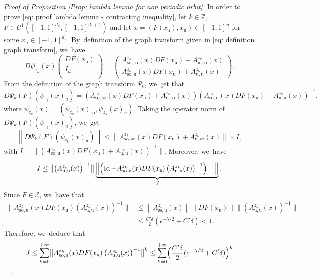 \documentclass[JEP,XML,SOM,Unicode,NoEqCountersInSection,NoFloatCountersInSection,published]{cedram}
\newcommand{\rs}{\mathrm{s}}
\newcommand{\rso}{\mathrm{so}}
\newcommand{\ru}{\mathrm{u}}
\theoremstyle{definition}
\theoremstyle{plain}
\newcommand{\Ccal}{\mathcal{C}}
\newcommand{\Ecal}{\mathcal{E}}
\newcommand{\Z}{\mathbb{Z}}
\DeclareMathOperator{\Id}{Id}
\begin{document}
\begin{appendix}
\begin{proof}[Proof of Proposition \ref{Prop: lambda lemma for non periodic orbit}]
In order to prove \eqref{eq: proof lambda lemma - contracting inequality}, let $k \in \Z$, $F \in \Ccal^{1} ([-1,1]^{d_\ru}, [-1,1]^{d_\rs + 1})$ and let $x = (F(x_\ru), x_\ru) \in [-1,1]^{n}$ for some $x_\ru \in [-1,1]^{d_\ru}$. By~definition of the graph transform given in \eqref{eq: definition graph transform}, we~have
\begin{equation}
D \psi_{z_k} (x) \begin{pmatrix}
DF (x_\ru) \\
I_{d_\ru} \\
\end{pmatrix}
= \begin{pmatrix}
A_{\rso,\rso}^{z_k} (x) DF (x_\ru) + A_{\ru,\rso}^{z_k} (x) \\
A_{\rso,\ru}^{z_k} (x) DF (x_\ru) + A_{\ru,\ru}^{z_k} (x)
\end{pmatrix}.
\end{equation}
From the definition of the graph transform $\Psi_k$, we~get that
\[
D \Psi_k (F) \left(\psi_{z_k} (x)_u \right) = \left(A_{\rso,\rso}^{z_k} (x) DF (x_\ru) + A_{\ru,\rso}^{z_k} (x) \right) \left(A_{\rso,\ru}^{z_k} (x) DF (x_\ru) + A_{\ru,\ru}^{z_k} (x) \right)^{-1},
\]
where $\psi_{z_k} (x) = (\psi_{z_k} (x)_{\rso}, \psi_{z_k} (x)_u)$. Taking the operator norm of $ D \Psi_k (F) \left(\psi_{z_k} (x)_u \right)$, we~get
\[
\left\| D \Psi_k (F) \left(\psi_{z_k} (x)_u \right) \right\| \leq \left\| A_{\rso,\rso}^{z_k} (x) DF (x_\ru) + A_{\ru,\rso}^{z_k} (x) \right\| \times I,
\]
with $I = \bigl\| \left(A_{\rso,\ru}^{z_k} (x) DF (x_\ru) + A_{\ru,\ru}^{z_k} (x) \right)^{-1} \bigr\|$. Moreover, we~have
\begin{equation}\label{eq: majoration inverse}
I \leq \bigl\| \left(A_{\ru,\ru}^{z_k} (x) \right)^{-1} \bigr\| \underbrace{\Bigl\| \left(\Id + A_{\rso,\ru}^{z_k} (x) DF (x_\ru) \left(A_{\ru,\ru}^{z_k} (x) \right)^{-1} \right)^{-1} \Bigr\|}_{J}.
\end{equation}
Since $F \in \Ecal$, we~have that
\begin{align*}
\bigl\| A_{\rso,\ru}^{z_k} (x) DF (x_\ru) \left(A_{\ru,\ru}^{z_k} (x) \right)^{-1} \bigr\| &\leq \left\| A_{\rso,\ru}^{z_k} (x)\right\| \left\| DF (x_\ru)\right\| \bigl\| \left(A_{\ru,\ru}^{z_k} (x) \right)^{-1} \bigr\| \\
&\leq \frac{C' \delta}{2} (e^{- \lambda/2 } + C' \delta) < 1.
\end{align*}
Therefore, we~deduce that
\begin{align*}
J &\leq \sum_{k = 0}^{+ \infty} \bigl\| A_{\rso,\ru}^{z_k} (x) DF (x_\ru) \left(A_{\ru,\ru}^{z_k} (x) \right)^{-1} \bigr\|^k \leq \sum_{k = 0}^{+ \infty} \Bigl(\frac{C' \delta}{2} (e^{- \lambda/2 } + C' \delta) \Bigr)^k \\

\end{align*}
\end{proof}
\end{appendix}
\end{document}
